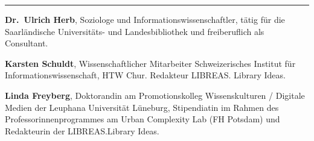 \begin{center}\rule{0.5\linewidth}{\linethickness}\end{center}

\textbf{Dr.~Ulrich Herb}, Soziologe und Informationswissenschaftler,
tätig für die Saarländische Universitäts- und Landesbibliothek und
freiberuflich als Consultant.

\textbf{Karsten Schuldt}, Wissenschaftlicher Mitarbeiter Schweizerisches
Institut für Informationswissenschaft, HTW Chur. Redakteur LIBREAS.
Library Ideas.

\textbf{Linda Freyberg}, Doktorandin am Promotionskolleg Wissenskulturen
/ Digitale Medien der Leuphana Universität Lüneburg, Stipendiatin im
Rahmen des Professorinnenprogrammes am Urban Complexity Lab (FH Potsdam)
und Redakteurin der LIBREAS.Library Ideas.
